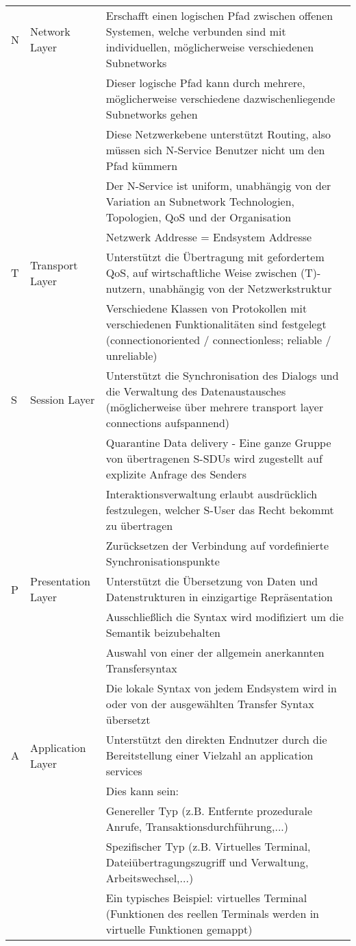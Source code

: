 \documentclass[10pt,landscape]{article}
\begin{document}
\begin{tabular}{l | l | l}
        \hline
    N & Network Layer & 
        Erschafft einen logischen Pfad zwischen offenen Systemen, welche verbunden sind mit individuellen, möglicherweise verschiedenen Subnetworks\\
        &&Dieser logische Pfad kann durch mehrere, möglicherweise verschiedene dazwischenliegende Subnetworks gehen\\
        &&Diese Netzwerkebene unterstützt Routing, also müssen sich N-Service Benutzer nicht um den Pfad kümmern\\
        &&Der N-Service ist uniform, unabhängig von der Variation an Subnetwork Technologien, Topologien, QoS und der Organisation\\
        &&Netzwerk Addresse = Endsystem Addresse\\
        \hline
    T & Transport Layer & 
        Unterstützt die Übertragung mit gefordertem QoS, auf wirtschaftliche Weise zwischen (T)-nutzern, unabhängig von der Netzwerkstruktur\\
        &&Verschiedene Klassen von Protokollen mit verschiedenen Funktionalitäten sind festgelegt (connectionoriented / connectionless; reliable / unreliable)\\
        \hline
    S & Session Layer &
        Unterstützt die Synchronisation des Dialogs und die Verwaltung des Datenaustausches (möglicherweise über mehrere transport layer connections aufspannend)\\
        &&Quarantine Data delivery - Eine ganze Gruppe von übertragenen S-SDUs wird zugestellt auf explizite Anfrage des Senders\\
        &&Interaktionsverwaltung erlaubt ausdrücklich festzulegen, welcher S-User das Recht bekommt zu übertragen\\
        &&Zurücksetzen der Verbindung auf vordefinierte Synchronisationspunkte\\
        \hline
    P & Presentation Layer &
        Unterstützt die Übersetzung von Daten und Datenstrukturen in einzigartige Repräsentation\\
        &&Ausschließlich die Syntax wird modifiziert um die Semantik beizubehalten\\
        &&Auswahl von einer der allgemein anerkannten Transfersyntax\\
        &&Die lokale Syntax von jedem Endsystem wird in oder von der ausgewählten Transfer Syntax übersetzt\\
        \hline
    A & Application Layer &
        Unterstützt den direkten Endnutzer durch die Bereitstellung einer Vielzahl an application services\\
        &&Dies kann sein:\\
        &&Genereller Typ (z.B. Entfernte prozedurale Anrufe, Transaktionsdurchführung,...)\\
        &&Spezifischer Typ (z.B. Virtuelles Terminal, Dateiübertragungszugriff und Verwaltung, Arbeitswechsel,...)\\
        &&Ein typisches Beispiel: virtuelles Terminal (Funktionen des reellen Terminals werden in virtuelle Funktionen gemappt)\\

\end{tabular}
\end{document}
